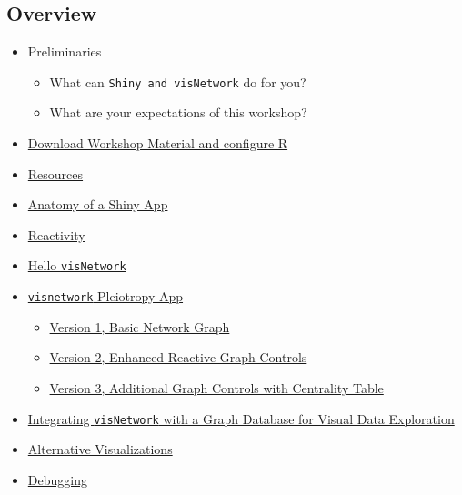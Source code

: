 \documentclass[10pt, letterpaper]{article}
\begin{document}
\begin{spacing}{1.0}

\section{Overview}

\begin{itemize}[noitemsep]
    \item Preliminaries
      \begin{itemize}
        \item What can \texttt{Shiny and visNetwork} do for you?
        \item What are your expectations of this workshop?
      \end{itemize}
    \item \hyperref[sec:accesworkshopmaterial]{Download Workshop Material and configure R}
    \item \hyperref[sec:resources]{Resources}
    \item \hyperref[sec:anatomyofapp]{Anatomy of a Shiny App}
    \item \hyperref[sec:reactivity]{Reactivity}
    \item \hyperref[sec:helloVisNetwork]{Hello \texttt{visNetwork}}
    \item \hyperref[sec:visNetwork]{\texttt{visnetwork} Pleiotropy App}
      \begin{itemize}[noitemsep]
        \item \hyperref[sec:visNetworkV1]{Version 1, Basic Network Graph}
        \item \hyperref[sec:visNetworkV2]{Version 2, Enhanced Reactive Graph Controls}
        \item \hyperref[sec:visNetworkV3]{Version 3, Additional Graph Controls with Centrality Table}
      \end{itemize}
    \item \hyperref[sec:UCD]{Integrating \texttt{visNetwork} with a Graph Database for Visual Data Exploration}
    \item \hyperref[sec:altvis]{Alternative Visualizations}
    \item \hyperref[sec:debugging]{Debugging}
\end{itemize}




\end{spacing}
\end{document}
